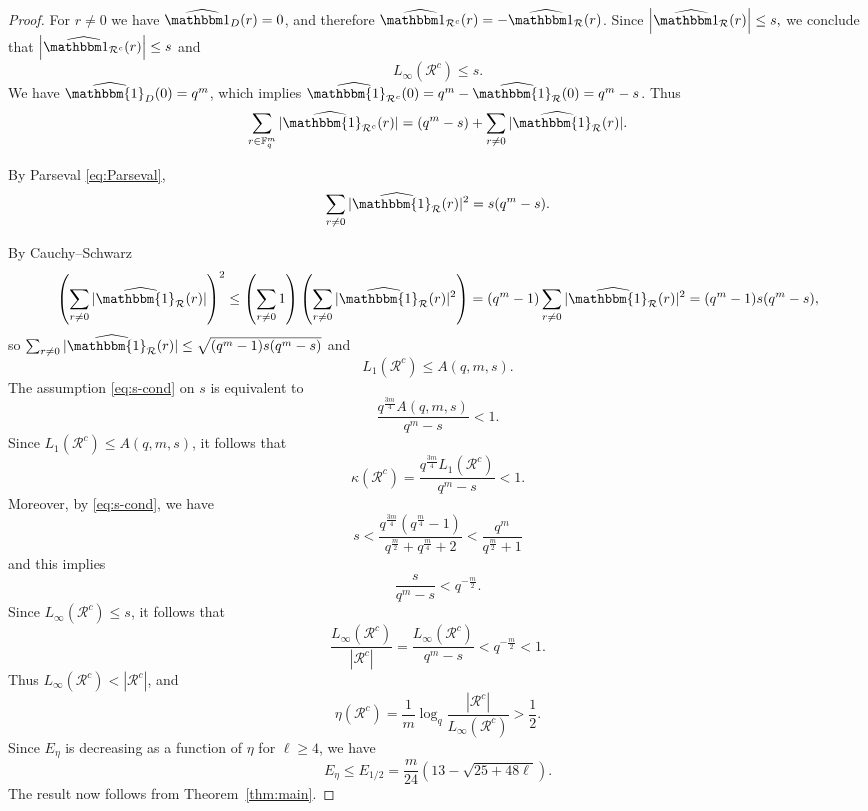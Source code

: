 \documentclass[10pt,a4paper]{amsart}
\newcommand{\F}{\mathbb F}
\begin{document}
\begin{proof}
    

For $r\neq0$ we have $\widehat{\mathbbm 1_{D}}(r)=0$, and therefore
$\widehat{\mathbbm 1_{\mathcal R^c}}(r)
=
-\widehat{\mathbbm 1_{\mathcal R}}(r)$. Since $\left|\widehat{\mathbbm 1_{\mathcal R}}(r)\right|\leq s,$ we conclude that $\left|\widehat{\mathbbm 1_{\mathcal R^c}}(r)\right|\leq s$ and
\[
L_\infty(\mathcal R^c)\leq s.
\]
We have $\widehat{\mathbbm{1}_{D}}(0)=q^m$, which implies $\widehat{\mathbbm{1}_{\mathcal{R}^c}}(0)=q^m- \widehat{\mathbbm{1}_{\mathcal{R}}}(0)= q^m-s$. Thus
\[
\sum_{r\in \F_q^m}|\widehat{\mathbbm{1}_{\mathcal{R}^c}}(r)|=(q^m-s)+\sum_{r\ne0}|\widehat{\mathbbm{1}_{\mathcal{R}}}(r)|.
\]

By Parseval \eqref{eq:Parseval},
\[
\sum_{r\not =0}|\widehat{\mathbbm{1}_{\mathcal{R}}}(r)|^2
=s(q^m -s).
\]

By Cauchy--Schwarz
\[
\left(\sum_{r\not =0}|\widehat{\mathbbm{1}_{\mathcal{R}}}(r)|\right)^2\leq
\left(\sum_{r\not=0}1\right)\left(\sum_{r\not =0}|\widehat{\mathbbm{1}_{\mathcal{R}}}(r)|^2\right)
=(q^m-1)\sum_{r\not=0}|\widehat{\mathbbm{1}_{\mathcal{R}}}(r)|^2=(q^{m}-1)s(q^m-s),
\]
so $\sum_{r\not=0}|\widehat{\mathbbm{1}_{\mathcal{R}}}(r)|\leq \sqrt{(q^m-1)s (q^m-s)}$ and
\[
L_1(\mathcal R^c)\leq A(q,m,s).
\]
The assumption \eqref{eq:s-cond} on $s$ is equivalent to
\[
\frac{q^{\frac{3m}{4}}A(q,m,s)}{q^m-s}<1.
\]
Since $L_1(\mathcal R^c)\leq A(q,m,s)$, it follows that
\[
\kappa(\mathcal R^c)
=
\frac{q^{\frac{3m}{4}}L_1(\mathcal R^c)}{q^m-s}
<1.
\]
Moreover, by \eqref{eq:s-cond}, we have 
\[s<\frac{q^{\frac{3m}{4}}
\left(q^{\frac m4}-1\right)}
{q^{\frac m2}+q^{\frac m4}+2}<\frac{q^m}{q^\frac{m}{2}+1}\]
and this implies
\[
\frac{s}{q^m-s}<q^{-\frac{m}{2}}.
\]
Since $L_\infty(\mathcal R^c)\leq s$, it follows that
\[
\frac{L_\infty(\mathcal R^c)}{|\mathcal R^c|}
=
\frac{L_\infty(\mathcal R^c)}{q^m-s}
<q^{-\frac{m}{2}}<1.
\]
Thus $L_\infty(\mathcal R^c)<|\mathcal R^c|$, and
\[
\eta(\mathcal R^c)
=
\frac1m\log_q
\frac{|\mathcal R^c|}{L_\infty(\mathcal R^c)}
>\frac12.\]
Since $E_\eta$ is decreasing as a function of $\eta$ for $\ell\geq4$, we have
\[
E_\eta\leq E_{1/2}
=
\frac m{24}\left(13-\sqrt{25+48\ell}\right).
\]
The result now follows from Theorem~\ref{thm:main}.

\end{proof}
\end{document}
